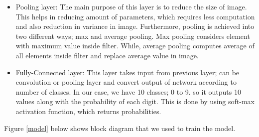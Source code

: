\documentclass[12pt, letterpaper]{article}
\begin{document}
\begin{itemize}
	\item Pooling layer: The main purpose of this layer is to reduce the size of image. This helps in reducing amount of parameters, which requires less computation and also reduction in variance in image. Furthermore, pooling is achieved into two different ways; max and average pooling. Max pooling considers element with maximum value inside filter. While, average pooling computes average of all elements inside filter and replace average value in image.
	\item Fully-Connected layer: This layer takes input from previous layer; can be convolution or pooling layer and convert output of network according to number of classes. In our case, we have 10 classes; 0 to 9. so it outputs 10 values along with the probability of each digit. This is done by using soft-max activation function, which returns probabilities. \cite{features_map}\cite{cnn_info}
\end{itemize}

Figure \ref{model} below shows block diagram that we used to train the 
model. 
\end{document}
